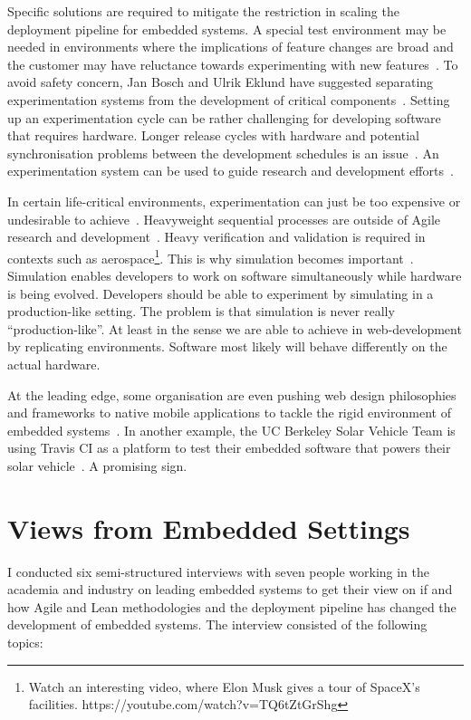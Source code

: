 \documentclass[english]{tktltiki2}
\begin{document}
Specific solutions are required to mitigate the restriction in scaling the deployment pipeline for embedded systems. A special test environment may be needed in environments where the implications of feature changes are broad and the customer may have reluctance towards experimenting with new features~\cite{FGM14}. To avoid safety concern, Jan Bosch and Ulrik Eklund have suggested separating experimentation systems from the development of critical components~\cite{BE12}. Setting up an experimentation cycle can be rather challenging for developing software that requires hardware. Longer release cycles with hardware and potential synchronisation problems between the development schedules is an issue~\cite{FGM14}. An experimentation system can be used to guide research and development efforts~\cite{HAB12}.

In certain life-critical environments, experimentation can just be too expensive or undesirable to achieve~\cite{BE12}. Heavyweight sequential processes are outside of Agile research and development~\cite{EHS14}. Heavy verification and validation is required in contexts such as aerospace\footnote{Watch an interesting video, where Elon Musk gives a tour of SpaceX’s facilities. https://youtube.com/watch?v=TQ6tZtGrShg}. This is why simulation becomes important~\cite{KRM13}. Simulation enables developers to work on software simultaneously while hardware is being evolved. Developers should be able to experiment by simulating in a production-like setting. The problem is that simulation is never really “production-like”. At least in the sense we are able to achieve in web-development by replicating environments. Software most likely will behave differently on the actual hardware.

At the leading edge, some organisation are even pushing web design philosophies and frameworks to native mobile applications to tackle the rigid environment of embedded systems~\cite{Boh13, GZ14}. In another example, the UC Berkeley Solar Vehicle Team is using Travis CI as a platform to test their embedded software that powers their solar vehicle~\cite{Ngy15}. A promising sign.


\section{Views from Embedded Settings}

I conducted six semi-structured interviews with seven people working in the academia and industry on leading embedded systems to get their view on if and how Agile and Lean methodologies and the deployment pipeline has changed the development of embedded systems. The interview consisted of the following topics:
\end{document}
